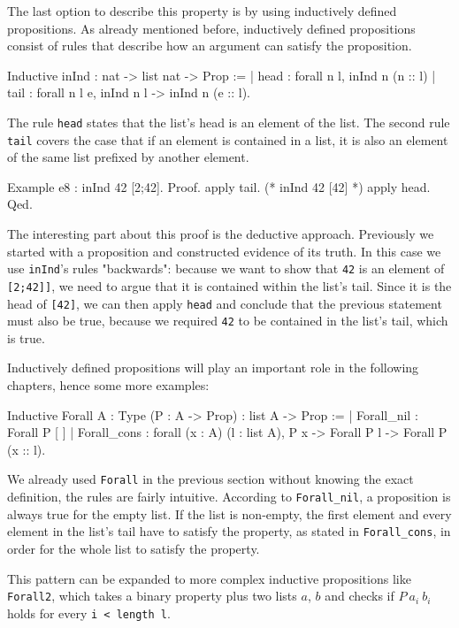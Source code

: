 \documentclass[paper = a4, fleqn, twoside]{scrreprt}
\newcommand{\coqinline}[1]{\texttt{#1}}
\begin{document}
\par \noindent
The last option to describe this property is by using inductively defined propositions. As already mentioned before, inductively defined propositions consist of rules that describe how an argument can satisfy the proposition.
\label{In}
\begin{coqcode}
Inductive inInd : nat -> list nat -> Prop :=
  | head : forall n l, inInd n (n :: l)
  | tail : forall n l e, inInd n l -> inInd n (e :: l).
\end{coqcode} 
The rule \coqinline{head} states that the list's head is an element of the list. The second rule \coqinline{tail} covers the case that if an element is contained in a list, it is also an element of the same list prefixed by another element.
\begin{coqcode}
Example e8 : inInd 42 [2;42].
Proof. 
  apply tail.  (* inInd 42 [42] *)
  apply head.
Qed.           
\end{coqcode}
The interesting part about this proof is the deductive approach. Previously we started with a proposition and constructed evidence of its truth. In this case we use \coqinline{inInd}'s rules "backwards": because we want to show that \coqinline{42} is an element of \coqinline{[2;42]]}, we need to argue that it is contained within the list's tail. Since it is the head of \coqinline{[42]}, we can then apply \coqinline{head} and conclude that the previous statement must also be true, because we required \coqinline{42} to be contained in the list's tail, which is true.
\par
Inductively defined propositions will play an important role in the following chapters, hence some more examples:
\begin{coqcode}
Inductive Forall {A : Type} (P : A -> Prop) : list A -> Prop :=
  | Forall_nil : Forall P [ ]
  | Forall_cons : forall (x : A) (l : list A), P x -> Forall P l ->
                    Forall P (x :: l).
\end{coqcode}
We already used \coqinline{Forall} in the previous section without knowing the exact definition, the rules are fairly intuitive. According to \coqinline{Forall_nil}, a proposition is always true for the empty list. If the list is non-empty, the first element and every element in the list's tail have to satisfy the property, as stated in \coqinline{Forall_cons}, in order for the whole list to satisfy the property.
\par
This pattern can be expanded to more complex inductive propositions like \coqinline{Forall2}, which takes a binary property plus two lists $a$, $b$ and checks if $P ~ a_{i} ~ b_{i}$ holds for every \coqinline{i < length l}.
\end{document}
